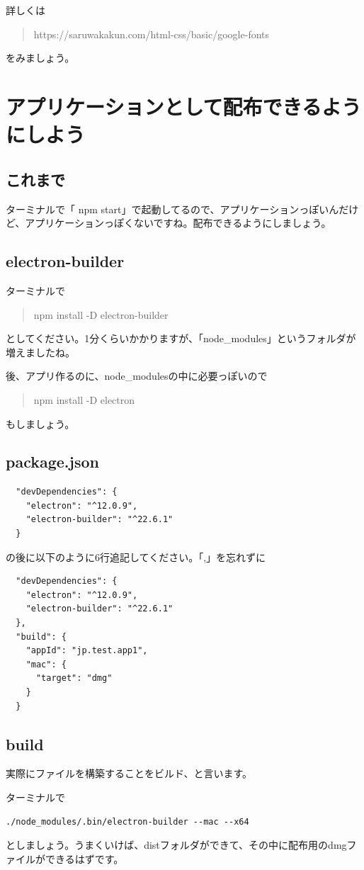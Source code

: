\documentclass[mingoth,11pt,a4j,uplatex]{jsarticle}
\begin{document}
詳しくは
\begin{quote}
https://saruwakakun.com/html-css/basic/google-fonts
\end{quote}
をみましょう。

\section{アプリケーションとして配布できるようにしよう}
\subsection{これまで}
ターミナルで「 npm start」で起動してるので、アプリケーションっぽいんだけど、アプリケーションっぽくないですね。配布できるようにしましょう。

\subsection{electron-builder}
ターミナルで
\begin{quote}
npm install -D electron-builder
\end{quote}
としてください。1分くらいかかりますが、「node\_modules」というフォルダが増えましたね。

後、アプリ作るのに、node\_modulesの中に必要っぽいので
\begin{quote}
npm install -D electron
\end{quote}
もしましょう。

\subsection{package.json}
\begin{verbatim}
  "devDependencies": {
    "electron": "^12.0.9",
    "electron-builder": "^22.6.1"
  }
\end{verbatim}
の後に以下のように6行追記してください。「,」を忘れずに
\begin{verbatim}
  "devDependencies": {
    "electron": "^12.0.9",
    "electron-builder": "^22.6.1"
  },
  "build": {
    "appId": "jp.test.app1",
    "mac": {
      "target": "dmg"
    }
  }
\end{verbatim}

\subsection{build}
実際にファイルを構築することをビルド、と言います。

ターミナルで
\begin{verbatim}
./node_modules/.bin/electron-builder --mac --x64
\end{verbatim}
としましょう。うまくいけば、distフォルダができて、その中に配布用のdmgファイルができるはずです。
\end{document}

